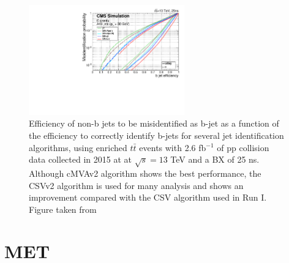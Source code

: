 \begin{figure}[ht]%
  \begin{center}
    \includegraphics[width=0.6\textwidth]{figuras/Chapter3/bjet_performance_algos.pdf}
    \caption{Efficiency of non-b jets to be misidentified as b-jet as a function of the efficiency to correctly identify
             b-jets for several jet identification algorithms, using enriched $t\bar{t}$ events with 2.6 fb$^{-1}$ of pp 
             collision data collected in 2015 at at $\sqrt{s}=13$ TeV and a BX of 25 ns. Although cMVAv2 algorithm 
             shows the best performance, the CSVv2 algorithm is used for many analysis and shows an improvement compared 
             with the CSV algorithm used in Run I. Figure taken from \cite{CMS:2016kkf}}
    \label{fig:bjetRun1vsRun2}
  \end{center}
\end{figure}

\section{MET}
\label{sec:MET}


